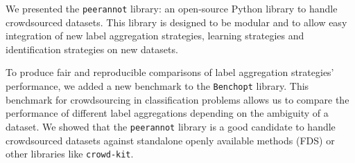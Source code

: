 We presented the \texttt{peerannot} library: an open-source Python library to handle crowdsourced datasets.
This library is designed to be modular and to allow easy integration of new label aggregation strategies, learning strategies and identification strategies on new datasets.

To produce fair and reproducible comparisons of label aggregation strategies' performance, we added a new benchmark to the \texttt{Benchopt} library.
This benchmark for crowdsourcing in classification problems allows us to compare the performance of different label aggregations depending on the ambiguity of a dataset.
We showed that the \texttt{peerannot} library is a good candidate to handle crowdsourced datasets against standalone openly available methods (FDS) or other libraries like \texttt{crowd-kit}.

